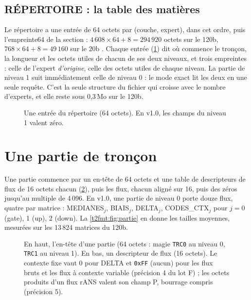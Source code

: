 \subsection{RÉPERTOIRE : la table des matières}

Le répertoire a une entrée de 64 octets par (couche, expert), dans cet ordre, puis l'empreinte64 de la section : $4\,608 \times 64 + 8 = 294\,920$ octets sur le 120b, $768 \times 64 + 8 = 49\,160$ sur le 20b \calc. Chaque entrée (\cref{t2fmt:fig:repertoire}) dit où commence le tronçon, la longueur et les octets utiles de chacun de ses deux niveaux, et trois empreintes : celle de l'expert \emph{d'origine}, celle des octets utiles de chaque niveau. La partie de niveau 1 suit immédiatement celle de niveau 0 : le mode exact lit les deux en une seule requête. C'est la seule structure du fichier qui croisse avec le nombre d'experts, et elle reste sous 0,3\,Mo sur le 120b.

\begin{figure}[ht]
\centering
\TdFmtRepertoire
\caption[Une entrée du répertoire]{Une entrée du répertoire (64 octets). En v1.0, les champs du niveau 1 valent zéro.}
\label{t2fmt:fig:repertoire}
\end{figure}

\section{Une partie de tronçon}\label{t2fmt:sec:partie}

Une partie commence par un en-tête de 64 octets et une table de descripteurs de flux de 16 octets chacun (\cref{t2fmt:fig:partie-entete}), puis les flux, chacun aligné sur 16, puis des zéros jusqu'au multiple de 4\,096. En v1.0, une partie de niveau 0 porte douze flux, quatre par matrice : MEDIANES$_j$, BIAIS$_j$, DELTA$_j$, CODES\_CTX$_j$ pour $j = 0$ (gate), 1 (up), 2 (down). La \cref{t2fmt:fig:partie} en donne les tailles moyennes, mesurées sur les 13\,824 matrices du 120b.

\begin{figure}[ht]
\centering
\TdFmtPartieEntete
\caption[L'en-tête d'une partie et un descripteur de flux]{En haut, l'en-tête d'une partie (64 octets : magie \texttt{TRC0} au niveau 0, \texttt{TRC1} au niveau 1). En bas, un descripteur de flux (16 octets). Le contexte fixe vaut 0 pour DELTA et \texttt{0xFF} (aucun) pour les flux bruts et les flux à contexte variable (précision 4 du lot F) ; les octets produits d'un flux rANS valent son champ P, bourrage compris (précision 5).}
\label{t2fmt:fig:partie-entete}
\end{figure}

